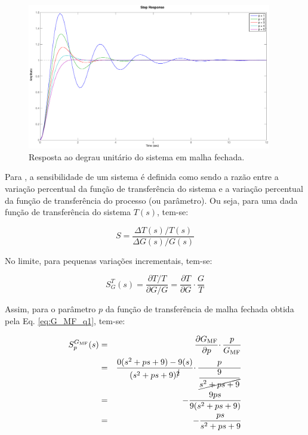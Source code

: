 \begin{figure}[htb]
\centering
    \includegraphics[width=0.95\textwidth]{imgs/questao1/resp_deg_mf}
    \caption{Resposta ao degrau unitário do sistema em malha fechada.}
    \label{fig:resp_deg_mf}
\end{figure}

Para , a sensibilidade de um sistema é definida como sendo
a razão entre a variação percentual da função de transferência do sistema e a
variação percentual da função de transferência do processo (ou parâmetro). Ou
seja, para uma dada função de transferência do sistema $T(s)$, tem-se:

\begin{equation}
S = \frac{\Delta T(s)/T(s)}{\Delta G(s)/G(s)}
\end{equation}

No limite, para pequenas variações incrementais, tem-se:

\begin{equation}
S_G^T(s) = \frac{\partial T / T}{ \partial G / G} 
         = \frac{\partial T}{\partial G} \cdotp \frac{G}{T}
\end{equation}

Assim, para o parâmetro $p$ da função de transferência de malha fechada
obtida pela Eq. \ref{eq:G_MF_q1}, tem-se:

\begin{eqnarray}
S_p^{G_{\text{MF}}}(s) & = & \frac{\partial G_{\text{MF}}}{\partial p} \cdotp
\frac{p}{G_{\text{MF}}}\nonumber \\
         & = & \frac{0(s^2 + ps + 9) - 9(s)}{(s^2 + ps + 9)^{\cancel{2}}} \cdotp
               \frac{p}{\displaystyle\frac{9}{\cancel{s^2 + ps + 9}}}\nonumber\\
         & = & - \frac{9ps}{9(s^2 + ps + 9)}\nonumber\\
         & = & - \frac{ps}{s^2 + ps + 9}\label{eq:sensib}
\end{eqnarray}

